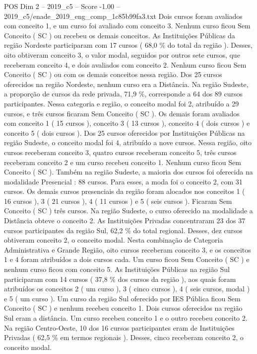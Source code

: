 \begin{textsample}{POS Dim 2 – 2019\_c5 – Score -1.00 – 2019\_c5/enade\_2019\_eng\_comp\_1c85b99fa3.txt}
Dois cursos foram avaliados com conceito 1, e um curso foi avaliado com conceito 3.
Nenhum curso ficou Sem Conceito ( SC ) ou recebeu os demais conceitos.
As Instituições Públicas da região Nordeste participaram com 17 cursos ( 68,0 \% do total da região ).
Desses, oito obtiveram conceito 3, o valor modal, seguidos por outros sete cursos, que receberam conceito 4, e dois avaliados com conceito 2.
Nenhum curso ficou Sem Conceito ( SC ) ou com os demais conceitos nessa região.
Dos 25 cursos oferecidos na região Nordeste, nenhum curso era a Distância.
Na região Sudeste, a proporção de cursos da rede privada, 71,9 \%, corresponde a 64 dos 89 cursos participantes.
Nessa categoria e região, o conceito modal foi 2, atribuído a 29 cursos, e três cursos ficaram Sem Conceito ( SC ).
Os demais foram avaliados com conceito 1 ( 15 cursos ), conceito 3 ( 13 cursos ), conceito 4 ( dois cursos ) e conceito 5 ( dois cursos ).
Dos 25 cursos oferecidos por Instituições Públicas na região Sudeste, o conceito modal foi 4, atribuído a nove cursos.
Nessa região, oito cursos receberam conceito 3, quatro cursos receberam conceito 5, três cursos receberam conceito 2 e um curso recebeu conceito 1.
Nenhum curso ficou Sem Conceito ( SC ).
Também na região Sudeste, a maioria dos cursos foi oferecida na modalidade Presencial : 88 cursos.
Para esses, a moda foi o conceito 2, com 31 cursos.
Os demais cursos presenciais da região foram alocados nos conceitos 1 ( 16 cursos ), 3 ( 21 cursos ), 4 ( 11 cursos ) e 5 ( seis cursos ).
Ficaram Sem Conceito ( SC ) três cursos.
Na região Sudeste, o curso oferecido na modalidade a Distância obteve o conceito 2.
As Instituições Privadas concentraram 23 dos 37 cursos participantes da região Sul, 62,2 \% do total regional.
Desses, dez cursos obtiveram conceito 2, o conceito modal.
Nesta combinação de Categoria Administrativa e Grande Região, oito cursos receberam conceito 3, e os conceitos 1 e 4 foram atribuídos a dois cursos cada.
Um curso ficou Sem Conceito ( SC ) e nenhum curso ficou com conceito 5.
As Instituições Públicas na região Sul participaram com 14 cursos ( 37,8 \% dos cursos da região ), aos quais foram atribuídos os conceitos 2 ( um curso ), 3 ( cinco cursos ), 4 ( seis cursos, modal ) e 5 ( um curso ).
Um curso da região Sul oferecido por IES Pública ficou Sem Conceito ( SC ) e nenhum recebeu conceito 1.
Dois cursos oferecidos na região Sul eram a distância.
Um curso recebeu conceito 1 e o outro recebeu conceito 2.
Na região Centro-Oeste, 10 dos 16 cursos participantes eram de Instituições Privadas ( 62,5 \% em termos regionais ).
Desses, cinco receberam conceito 2, o conceito modal.

\end{textsample}
